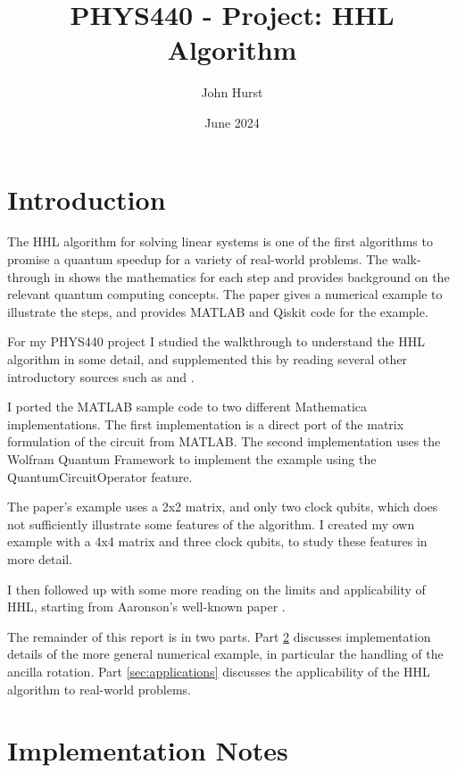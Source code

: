 \documentclass[12pt]{extarticle}
\title{PHYS440 - Project: HHL Algorithm}
\author{John Hurst}
\date{June 2024}
\begin{document}
\maketitle

\section{Introduction}

The HHL algorithm for solving linear systems\cite{hhl2009} is one of the first algorithms to promise a quantum speedup for a variety of real-world problems.
The walk-through in \cite{zaman2023step} shows the mathematics for each step and provides background on the relevant quantum computing concepts.
The paper gives a numerical example to illustrate the steps, and provides MATLAB and Qiskit code for the example.

For my PHYS440 project I studied the walkthrough to understand the HHL algorithm in some detail,
and supplemented this by reading several other introductory sources such as \cite{baaquie2023} and \cite{hidary2021}.

I ported the MATLAB sample code to two different Mathematica implementations.
The first implementation is a direct port of the matrix formulation of the circuit from MATLAB.
The second implementation uses the Wolfram Quantum Framework to implement the example using the QuantumCircuitOperator feature.

The paper's example uses a 2x2 matrix, and only two clock qubits, which does not sufficiently illustrate some features of the algorithm.
I created my own example with a 4x4 matrix and three clock qubits, to study these features in more detail.

I then followed up with some more reading on the limits and applicability of HHL, starting from Aaronson's well-known paper \cite{aaronson2015read}.

The remainder of this report is in two parts.
Part \ref{sec:implementation} discusses implementation details of the more general numerical example, in particular the handling of the ancilla rotation.
Part \ref{sec:applications} discusses the applicability of the HHL algorithm to real-world problems.

\section{Implementation Notes}\label{sec:implementation}
\end{document}

